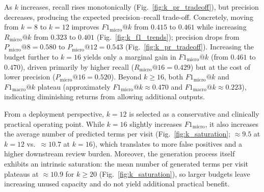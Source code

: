 As $k$ increases, recall rises monotonically (Fig.~\ref{fig:k_pr_tradeoff}), but precision decreases, producing the expected precision--recall trade-off. Concretely, moving from $k=8$ to $k=12$ improves $F1_{\text{micro}}@k$ from $0.415$ to $0.461$ while increasing $R_{\text{micro}}@k$ from $0.323$ to $0.401$ (Fig.~\ref{fig:k_f1_trends}); precision drops from $P_{\text{micro}}@8=0.580$ to $P_{\text{micro}}@12=0.543$ (Fig.~\ref{fig:k_pr_tradeoff}). Increasing the budget further to $k=16$ yields only a marginal gain in $F1_{\text{micro}}@k$ (from $0.461$ to $0.470$), driven primarily by higher recall ($R_{\text{micro}}@16=0.429$) but at the cost of lower precision ($P_{\text{micro}}@16=0.520$). Beyond $k\ge 16$, both $F1_{\text{micro}}@k$ and $F1_{\text{macro}}@k$ plateau (approximately $F1_{\text{micro}}@k\approx 0.470$ and $F1_{\text{macro}}@k\approx 0.223$), indicating diminishing returns from allowing additional outputs.

From a deployment perspective, $k=12$ is selected as a conservative and clinically practical operating point. While $k=16$ slightly increases $F1_{\text{micro}}$, it also increases the average number of predicted terms per visit (Fig.~\ref{fig:k_saturation}; $\approx 9.5$ at $k=12$ vs.\ $\approx 10.7$ at $k=16$), which translates to more false positives and a higher downstream review burden. Moreover, the generation process itself exhibits an intrinsic saturation: the mean number of generated terms per visit plateaus at $\approx 10.9$ for $k\ge 20$ (Fig.~\ref{fig:k_saturation}), so larger budgets leave increasing unused capacity and do not yield additional practical benefit.

